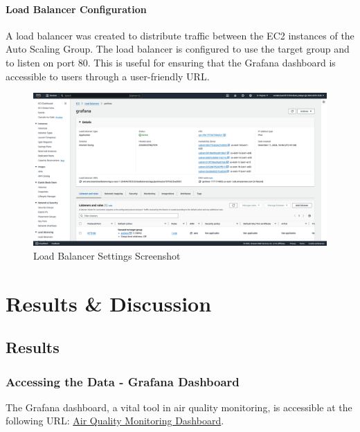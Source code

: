 \documentclass[12pt,oneside]{book} %
\begin{document}
\newpage
\subsubsection{Load Balancer Configuration}
A load balancer was created to distribute traffic between the EC2 instances of
the Auto Scaling Group. The load balancer is configured to use the target group
and to listen on port 80. This is useful for ensuring that the Grafana
dashboard is accessible to users through a user-friendly URL.
\begin{figure}[H]
    \centering
    \includegraphics[width=1\linewidth]{images/load-balancer.png}
    \caption{Load Balancer Settings Screenshot}\label{fig:load-balancer-settings}
\end{figure}

\newpage
\chapter{Results \& Discussion}

\section{Results}
\subsection{Accessing the Data - Grafana Dashboard}

The Grafana dashboard, a vital tool in air quality monitoring, is accessible at
the following URL:
\href{http://grafana-1777174802.us-east-1.elb.amazonaws.com/d/f8742187-f440-4ee8-96cc-bad5af8edef1/air-quality-monitoring}{Air
    Quality Monitoring Dashboard}.
\end{document}
